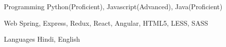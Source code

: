 

\begin{cvskills}

  \cvskill
    {Programming} %
    {Python(Proficient), Javascript(Advanced), Java(Proficient)} %

  \cvskill
    {Web} %
    {Spring, Express, Redux, React, Angular, HTML5, LESS, SASS} %

  \cvskill
    {Languages} %
    {Hindi, English} %

\end{cvskills}
